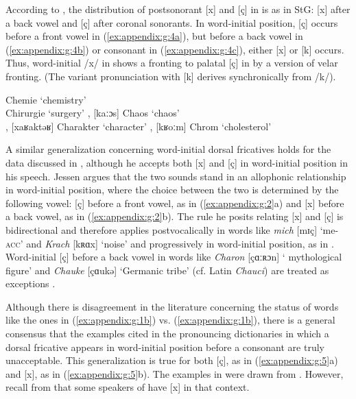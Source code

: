 According to \citet{HoveHaas2009}, the distribution of postsonorant [x] and [ç] in  is as in StG: [x] after a back vowel and [ç] after coronal sonorants. In word-initial position, [ç] occurs before a front vowel in (\ref{ex:appendix:g:4a}), but before a back vowel in (\ref{ex:appendix:g:4b}) or consonant in (\ref{ex:appendix:g:4c}), either [x] or [k] occurs. Thus, word-initial /x/ in  shows a fronting to palatal [ç] in  by a version of velar fronting. (The variant pronunciation with [k] derives synchronically from /k/).

\ea%
\label{ex:appendix:g:4}
\ea\label{ex:appendix:g:4a}
    \relax [çemiː]    \tab Chemie    \tab ‘chemistry’\\
    \relax [çiʁʊʁgiː] \tab Chirurgie \tab  ‘surgery’
\ex\label{ex:appendix:g:4b}
    \relax [xaːɔs], [kaːɔs] \tab Chaos  \tab  ‘chaos’\\
    \relax [xaʁaktəʁ], [xaʁaktəʁ] \tab Charakter \tab ‘character’
\ex\label{ex:appendix:g:4c}
    \relax [xʁoːm], [kʁoːm] \tab Chrom  \tab  ‘cholesterol’
\z
\z

A similar generalization concerning word-initial dorsal fricatives holds for the data discussed in \citet{Jessen1988}, although he accepts both [x] and [ç] in word-initial position in his speech. Jessen argues that the two sounds stand in an allophonic relationship in word-initial position, where the choice between the two is determined by the following vowel: [ç] before a front vowel, as in (\ref{ex:appendix:g:2}a) and [x] before a back vowel, as in (\ref{ex:appendix:g:2}b). The rule he posits relating [x] and [ç] is bidirectional and therefore applies postvocalically in words like \textit{mich} [mɪç] ‘me-\textsc{acc}’ and \textit{Krach} [kʀɑx] ‘noise’ and progressively in word-initial position, as in . Word-initial [ç] before a back vowel in words like \textit{Charon} [çɑːʀɔn] ‘ mythological figure’ and \textit{Chauke} [çɑukə] ‘Germanic tribe’ (cf. Latin \textit{Chauci}) are treated as exceptions \citep[391]{Jessen1988}.

Although there is disagreement in the literature concerning the status of words like the ones in (\ref{ex:appendix:g:1b}) vs. (\ref{ex:appendix:g:1b}), there is a general consensus that the examples cited in the pronouncing dictionaries in which a dorsal fricative appears in word-initial position before a consonant are truly unacceptable. This generalization is true for both [ç], as in (\ref{ex:appendix:g:5}a) and [x], as in (\ref{ex:appendix:g:5}b). The examples in  were drawn from \citet{Mangold2005}. However, recall from  that some speakers of  have [x] in that context.

